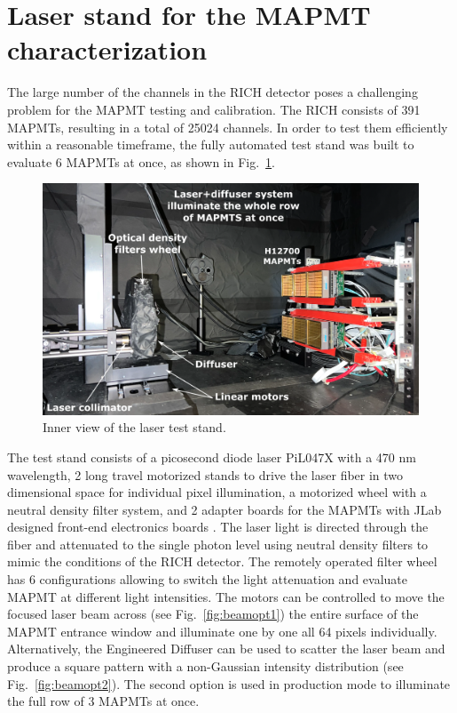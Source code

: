 
\section{Laser stand for the MAPMT characterization}
The large number of the channels in the RICH detector  poses a challenging problem for the MAPMT testing and calibration.
The RICH consists of 391 MAPMTs, resulting in a total of 25024 channels. In order to test them efficiently within a reasonable timeframe, the fully automated test stand was built to evaluate 6 MAPMTs at once, as shown in Fig.~\ref{fig:MAPMTtest}.

\begin{figure}[hbt]
	\centering
	\includegraphics[width=0.9\linewidth]{figures/LaserSetup.png}
	\caption{Inner view of the laser test stand.}
	\label{fig:MAPMTtest}
\end{figure}

The test stand consists of a picosecond diode  laser PiL047X with a 470 nm wavelength, 2 long travel motorized stands to drive the laser fiber in two dimensional space for individual pixel illumination, a motorized wheel with a neutral density filter system, and 2 adapter boards for the MAPMTs with JLab designed front-end electronics boards \cite{Contalbrigo:2020}.
The laser light is directed through the fiber and attenuated to the single photon level using neutral density filters to mimic the conditions of the RICH detector.
The remotely operated filter wheel has 6 configurations allowing to switch the light attenuation and evaluate MAPMT at different light intensities.
The motors can be controlled to move the focused laser beam across (see Fig.~\ref{fig:beamopt1}) the entire surface of the MAPMT entrance window and illuminate one by one all 64 pixels individually.
Alternatively, the Engineered Diffuser can be used to scatter the laser beam and produce a square pattern with a non-Gaussian intensity distribution (see Fig.~\ref{fig:beamopt2}). 
The second option is used in production mode to illuminate the full row of 3 MAPMTs at once.

